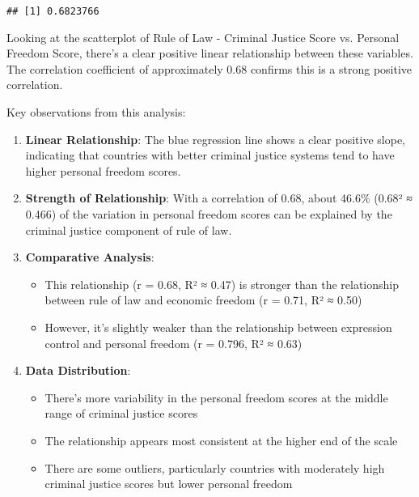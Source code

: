 \documentclass[
]{article}
\newenvironment{Shaded}{\begin{snugshade}}{\end{snugshade}}
\newcommand{\AttributeTok}[1]{\textcolor[rgb]{0.13,0.29,0.53}{#1}}
\newcommand{\CommentTok}[1]{\textcolor[rgb]{0.56,0.35,0.01}{\textit{#1}}}
\newcommand{\FunctionTok}[1]{\textcolor[rgb]{0.13,0.29,0.53}{\textbf{#1}}}
\newcommand{\NormalTok}[1]{#1}
\newcommand{\SpecialCharTok}[1]{\textcolor[rgb]{0.81,0.36,0.00}{\textbf{#1}}}
\newcommand{\StringTok}[1]{\textcolor[rgb]{0.31,0.60,0.02}{#1}}
\providecommand{\tightlist}{%
  \setlength{\itemsep}{0pt}\setlength{\parskip}{0pt}}
\begin{document}
\begin{Shaded}
\end{Shaded}

\begin{verbatim}
## [1] 0.6823766
\end{verbatim}

Looking at the scatterplot of Rule of Law - Criminal Justice Score vs.
Personal Freedom Score, there's a clear positive linear relationship
between these variables. The correlation coefficient of approximately
0.68 confirms this is a strong positive correlation.

Key observations from this analysis:

\begin{enumerate}
\def\labelenumi{\arabic{enumi}.}
\item
  \textbf{Linear Relationship}: The blue regression line shows a clear
  positive slope, indicating that countries with better criminal justice
  systems tend to have higher personal freedom scores.
\item
  \textbf{Strength of Relationship}: With a correlation of 0.68, about
  46.6\% (0.68² ≈ 0.466) of the variation in personal freedom scores can
  be explained by the criminal justice component of rule of law.
\item
  \textbf{Comparative Analysis}:

  \begin{itemize}
  \tightlist
  \item
    This relationship (r = 0.68, R² ≈ 0.47) is stronger than the
    relationship between rule of law and economic freedom (r = 0.71, R²
    ≈ 0.50)
  \item
    However, it's slightly weaker than the relationship between
    expression control and personal freedom (r = 0.796, R² ≈ 0.63)
  \end{itemize}
\item
  \textbf{Data Distribution}:

  \begin{itemize}
  \tightlist
  \item
    There's more variability in the personal freedom scores at the
    middle range of criminal justice scores
  \item
    The relationship appears most consistent at the higher end of the
    scale
  \item
    There are some outliers, particularly countries with moderately high
    criminal justice scores but lower personal freedom
  \end{itemize}
\end{enumerate}
\end{document}
